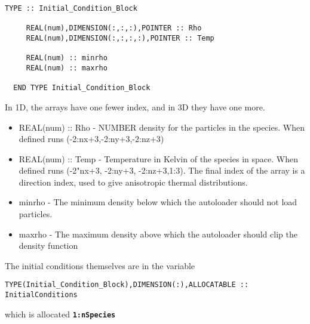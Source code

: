 \documentclass[12pt]{article}
\newcommand{\simpleboxverbatim}{\begin{Verbatim}[obeytabs=true,frame=single,
  framerule=0.5mm,rulecolor=\color{warwickmid}]}
\newcommand{\inlinecode}[1]{{\color{warwickred} \bf\texttt{#1}}}
\begin{document}
\simpleboxverbatim
  TYPE :: Initial_Condition_Block

     REAL(num),DIMENSION(:,:,:),POINTER :: Rho
     REAL(num),DIMENSION(:,:,:,:),POINTER :: Temp

     REAL(num) :: minrho
     REAL(num) :: maxrho

  END TYPE Initial_Condition_Block
\end{Verbatim}

In 1D, the arrays have one fewer index, and in 3D they have one more.
\begin{itemize}
\item REAL(num) :: Rho - NUMBER density for the particles in the species. When
  defined runs (-2:nx+3,-2:ny+3,-2:nz+3)
\item REAL(num) :: Temp - Temperature in Kelvin of the species in space. When
  defined runs (-2"nx+3, -2:ny+3, -2:nz+3,1:3). The final index of the array
  is a direction index, used to give anisotropic thermal distributions.
\item minrho - The minimum density below which the autoloader should not load
  particles.
\item maxrho - The maximum density above which the autoloader should clip the
  density function
\end{itemize}

The initial conditions themselves are in the variable
\simpleboxverbatim
  TYPE(Initial_Condition_Block),DIMENSION(:),ALLOCATABLE :: InitialConditions
\end{Verbatim}
which is allocated \inlinecode{1:nSpecies}
\end{document}
